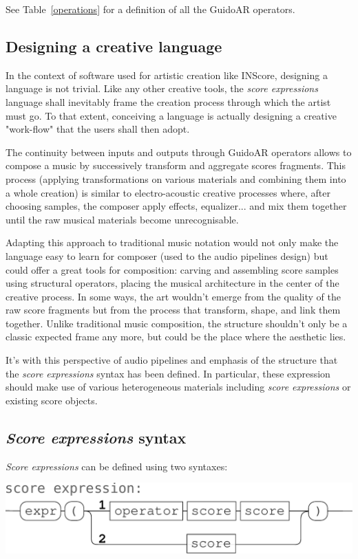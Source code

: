 \documentclass{article}
\newcommand{\sExpr}{\emph{score expressions} }
\newcommand{\SExpr}{\emph{Score expressions} }
\begin{document}
See Table~\ref{operations} for a definition of all the GuidoAR operators.

\subsection{Designing a creative language}
In the context of software used for artistic creation like INScore, designing a language is not trivial. Like any other creative tools,  the \sExpr language shall inevitably frame the creation process through which the artist must go. To that extent, conceiving a language is actually designing a creative "work-flow" that the users shall then adopt.

The continuity between inputs and outputs through GuidoAR operators allows to compose a music by successively transform and aggregate scores fragments. This process (applying transformations on various materials and combining them into a whole creation) is similar to electro-acoustic creative processes where, after choosing samples, the composer apply effects, equalizer... and mix them together until the raw musical materials become unrecognisable.

Adapting this approach to traditional music notation would not only make the language easy to learn for composer (used to the audio pipelines design) but could offer a great tools for composition: carving and assembling score samples using structural operators, placing the musical architecture in the center of the creative process. In some ways, the art wouldn't emerge from the quality of the raw score fragments but from the process that transform, shape, and link them together. Unlike traditional music composition, the structure shouldn't only be a classic expected frame any more, but could be the place where the aesthetic lies.

It's with this perspective of audio pipelines and emphasis of the structure that the \sExpr syntax has been defined. In particular, these expression should make use of various heterogeneous materials including \sExpr or existing score objects.

\subsection{\SExpr syntax}

\smallbreak
\SExpr can be defined using two syntaxes:
\begin{center}
\includegraphics[width=0.9\columnwidth]{imgs/syntax1}
\end{center}
\end{document}
